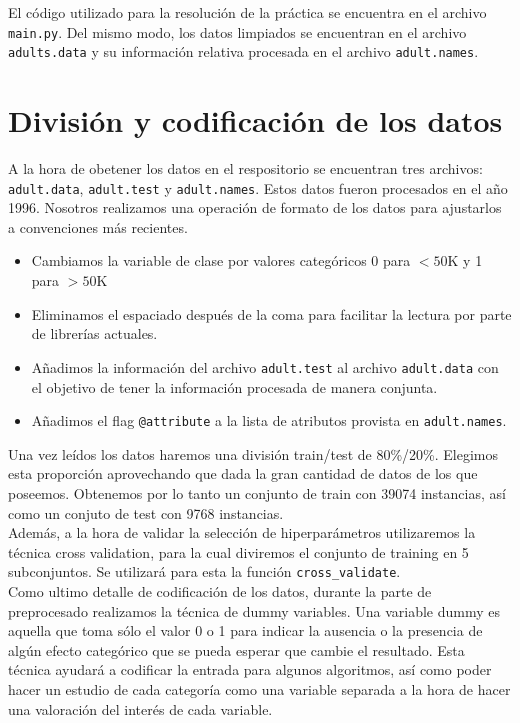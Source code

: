 \documentclass[11pt,a4paper]{article}
\begin{document}
El código utilizado para la resolución de la práctica se encuentra en el archivo \texttt{main.py}.  Del mismo modo, los datos limpiados se encuentran en el archivo \texttt{adults.data} y su información relativa procesada en el archivo \texttt{adult.names}.


\section{ División y codificación de los datos}

A la hora de obetener los datos en el respositorio se encuentran tres archivos: \texttt{adult.data},  \texttt{adult.test} y \texttt{adult.names}. Estos datos fueron procesados en el año 1996. Nosotros realizamos una operación de formato de los datos para ajustarlos a convenciones más recientes.

\begin{itemize}
\item Cambiamos la variable de clase por valores categóricos 0 para $<50$K y 1 para $>50$K
\item Eliminamos el espaciado después de la coma para facilitar la lectura por parte de librerías actuales.
\item Añadimos la información del archivo \texttt{adult.test} al archivo \texttt{adult.data} con el objetivo de tener la información procesada de manera conjunta.
\item Añadimos el flag \texttt{@attribute} a la lista de atributos provista en \texttt{adult.names}.
\end{itemize}

Una vez leídos los datos haremos una división train/test de 80\%/20\%. Elegimos esta proporción aprovechando que dada la gran cantidad de datos de los que poseemos. Obtenemos por lo tanto un conjunto de train con 39074 instancias, así como un conjuto de test con 9768 instancias.\\

Además, a la hora de validar la selección de hiperparámetros utilizaremos la técnica cross validation, para la cual diviremos el conjunto de training en 5 subconjuntos. Se utilizará para esta la función \texttt{cross\_validate}\cite{cv}.\\

Como ultimo detalle de codificación de los datos, durante la parte de preprocesado realizamos la técnica de dummy variables. Una variable dummy es aquella que toma sólo el valor 0 o 1 para indicar la ausencia o la presencia de algún efecto categórico que se pueda esperar que cambie el resultado. Esta técnica ayudará a codificar la entrada para algunos algoritmos, así como poder hacer un estudio de cada categoría como una variable separada a la hora de hacer una valoración del interés de cada variable.
\end{document}
